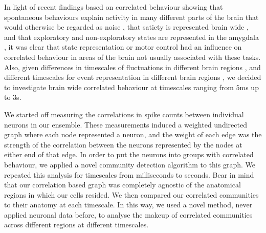 
In light of recent findings based on correlated behaviour showing that spontaneous behaviours explain activity in many different parts of the brain that would otherwise be regarded as noise \parencite{stringer}, that satiety is represented brain wide \parencite{allen}, and that exploratory and non-exploratory states are represented in the amygdala \parencite{grundemann}, it was clear that state representation or motor control had an influence on correlated behaviour in areas of the brain not usually associated with these tasks. Also, given differences in timescales of fluctuations in different brain regions \parencite{murray}, and different timescales for event representation in different brain regions \parencite{baldassano}, we decided to investigate brain wide correlated behaviour at timescales ranging from $5$ms up to $3$s.

We started off measuring the correlations in spike counts between individual neurons in our ensemble. These measurements induced a weighted undirected graph where each node represented a neuron, and the weight of each edge was the strength of the correlation between the neurons represented by the nodes at either end of that edge. In order to put the neurons into groups with correlated behaviour, we applied a novel community detection algorithm \parencite{humphries} to this graph. We repeated this analysis for timescales from milliseconds to seconds. Bear in mind that our correlation based graph was completely agnostic of the anatomical regions in which our cells resided. We then compared our correlated communities to their anatomy at each timescale. In this way, we used a novel method, never applied neuronal data before, to analyse the makeup of correlated communities across different regions at different timescales.

